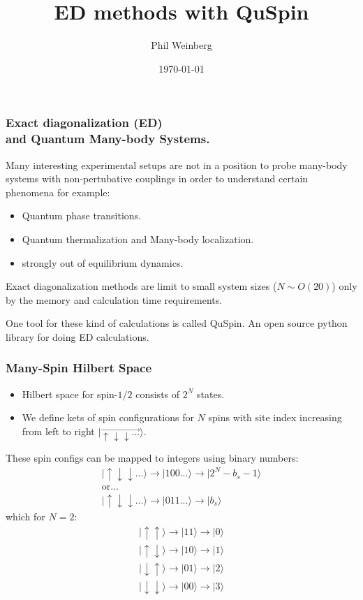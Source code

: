 \documentclass{beamer}
\newcommand\0{\scalebox{-1}[1]{0}}
\begin{document}
	
\title[weinbe58@bu.edu]{ED methods with QuSpin}
\author{Phil Weinberg}

\date{\today}


\begin{frame}
	\titlepage
\end{frame}

\begin{frame}
	\frametitle{Exact diagonalization (ED) \\ and Quantum Many-body Systems.}
	Many interesting experimental setups are not in a position to probe many-body systems with non-pertubative couplings in order to understand certain phenomena for example:
	\begin{itemize}
		\item Quantum phase transitions.
		\item Quantum thermalization and Many-body localization. 
		\item strongly out of equilibrium dynamics.
	\end{itemize}
	
	Exact diagonalization methods are limit to small system sizes ($N\sim O(20)$) only by the memory and calculation time requirements.
	
	One tool for these kind of calculations is called QuSpin. An open source python library for doing ED calculations. 

\end{frame}

\begin{frame}
\frametitle{Many-Spin Hilbert Space}
\begin{itemize}
\item Hilbert space for spin-$1/2$ consists of $2^N$ states.
\item  We define kets of spin configurations for $N$ spins with site index increasing from left to right $|\overrightarrow{\uparrow\downarrow\downarrow...}\rangle$.
\end{itemize}
 These spin configs can be mapped to integers using binary numbers:
\begin{gather*}
|\uparrow\downarrow\downarrow...\rangle\rightarrow|100...\rangle\rightarrow|2^N-b_s-1\rangle\\\mathrm{or...}\\
|\uparrow\downarrow\downarrow...\rangle\rightarrow|011...\rangle\rightarrow|b_s\rangle
\end{gather*}
which for $N=2$:
\begin{gather*}
|\uparrow\uparrow\rangle\rightarrow |11\rangle\rightarrow|0\rangle\\
|\uparrow\downarrow\rangle\rightarrow |10\rangle\rightarrow|1\rangle\\
|\downarrow\uparrow\rangle\rightarrow |01\rangle\rightarrow|2\rangle\\
|\downarrow\downarrow\rangle\rightarrow |00\rangle\rightarrow|3\rangle
\end{gather*}
\end{frame}
\end{document}
